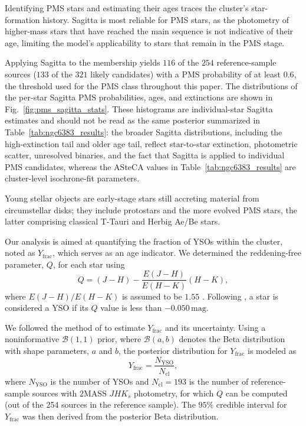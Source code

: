 \documentclass{aa}
\begin{document}
Identifying PMS stars and estimating their ages traces the cluster's star-formation history. Sagitta is most reliable for PMS stars, as the photometry of higher-mass stars that have reached the main sequence is not indicative of their age, limiting the model's applicability to stars that remain in the PMS stage.

Applying Sagitta to the membership yields $116$ of the $254$ reference-sample sources ($133$ of the $321$ likely candidates) with a PMS probability of at least $0.6$, the threshold used for the PMS class throughout this paper. The distributions of the per-star Sagitta PMS probabilities, ages, and extinctions are shown in Fig.~\ref{fig:pms_sagitta_stats}. These histograms are individual-star Sagitta estimates and should not be read as the same posterior summarized in Table~\ref{tab:ngc6383_results}: the broader Sagitta distributions, including the high-extinction tail and older age tail, reflect star-to-star extinction, photometric scatter, unresolved binaries, and the fact that Sagitta is applied to individual PMS candidates, whereas the ASteCA values in Table~\ref{tab:ngc6383_results} are cluster-level isochrone-fit parameters.


Young stellar objects are early-stage stars still accreting material from circumstellar disks; they include protostars and the more evolved PMS stars, the latter comprising classical T-Tauri and Herbig Ae/Be stars.

Our analysis is aimed at quantifying the fraction of YSOs within the cluster, noted as $ Y_{\text{frac}} $, which serves as an age indicator. We determined the reddening-free parameter, $ Q $, for each star using
\begin{equation}
	Q = (J - H) - \frac{E(J-H)}{E(H - K)} (H-K),
\end{equation}
where $ E(J-H)/E(H-K) $ is assumed to be $1.55$ \citep{1990ARA&A..28...37M}. Following \citet{2013MNRAS.436.1465B}, a star is considered a YSO if its $ Q $ value is less than $-0.050\,\mathrm{mag}$.

We followed the method of \citet{2011PASA...28..128C} to estimate $ Y_{\text{frac}} $ and its uncertainty. Using a noninformative $\mathcal{B}(1, 1)$ prior, where $\mathcal{B}(a,b)$ denotes the Beta distribution with shape parameters, $a$ and $b$, the posterior distribution for $ Y_{\text{frac}} $ is modeled as
\begin{equation}
	Y_{\text{frac}} = \frac{N_{\text{YSO}}}{N_{\text{cl}}},
\end{equation}
where $ N_{\text{YSO}} $ is the number of YSOs and $ N_{\text{cl}}=193 $ is the number of reference-sample sources with 2MASS $JHK_s$ photometry, for which $Q$ can be computed (out of the 254 sources in the reference sample). The $95\%$ credible interval for $ Y_{\text{frac}} $ was then derived from the posterior Beta distribution.
\end{document}
